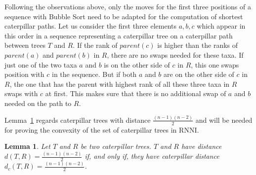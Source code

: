 \documentclass{amsart}
\newcommand{\rnni}{\mathrm{RNNI}}
\newtheorem{lemma}[definition]{Lemma}
\begin{document}
Following the observations above, only the moves for the first three positions of a sequence with Bubble Sort need to be adapted for the computation of shortest caterpillar paths.
Let us consider the first three elements $a,b,c$ which appear in this order in a sequence representing a caterpillar tree on a caterpillar path between trees $T$ and $R$.
If the rank of $parent(c)$ is higher than the ranks of $parent(a)$ and $parent(b)$ in $R$, there are no swaps needed for these taxa.
If just one of the two taxa $a$ and $b$ is on the other side of $c$ in $R$, this one swaps position with $c$ in the sequence.
But if both $a$ and $b$ are on the other side of $c$ in $R$, the one that has the parent with highest rank of all these three taxa in $R$ swaps with $c$ at first.
This makes sure that there is no additional swap of $a$ and $b$ needed on the path to $R$.

Lemma~\ref{lemma:caterpillar_dist=diameter} regards caterpillar trees with distance $\frac{(n-1)(n-2)}{2}$ and will be needed for proving the convexity of the set of caterpillar trees in $\rnni$.

\begin{lemma}
    Let $T$ and $R$ be two caterpillar trees.
    $T$ and $R$ have distance $d(T,R) = \frac{(n-1)(n-2)}{2}$ if, and only if, they have caterpillar distance $d_c(T,R) = \frac{(n-1)(n-2)}{2}$.
    \label{lemma:caterpillar_dist=diameter}
\end{lemma}
\end{document}
